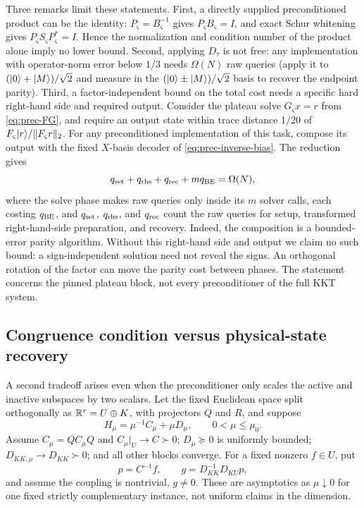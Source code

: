 Three remarks limit these statements.  First, a directly supplied
preconditioned product can be the identity: $P_\varsigma=B_\varsigma^{-1}$
gives $P_\varsigma B_\varsigma=I$, and exact Schur whitening gives
$P_\varsigma S_\varsigma P_\varsigma^*=I$.  Hence the normalization and
condition number of the product alone imply no lower bound.  Second,
applying $D_\tau$ is not free: any implementation with operator-norm error
below $1/3$ needs $\Omega(N)$ raw queries (apply it to $(\lvert 0\rangle+\lvert M\rangle)/\sqrt2$
and measure in the $(\lvert 0\rangle\pm\lvert M\rangle)/\sqrt2$ basis to recover the endpoint
parity).  Third, a factor-independent bound on the total cost needs a specific hard
right-hand side and required output.
Consider the plateau solve
$G_\varsigma x=r$ from \eqref{eq:prec-FG}, and require an output state within
trace distance $1/20$ of
$F_\varsigma\lvert r\rangle/\lVert F_\varsigma r\rVert_2$.  For any preconditioned
implementation of this task, compose its output with the fixed
$X$-basis decoder of \eqref{eq:prec-inverse-bias}.  The reduction gives
\begin{equation}
 q_{\rm set}+q_{\rm rhs}+q_{\rm rec}+m q_{\rm BE}=\Omega(N),
 \label{eq:prec-end-to-end-conservation}
\end{equation}
where the solve phase makes raw queries only inside its $m$ solver calls,
each costing $q_{\rm BE}$, and $q_{\rm set}$, $q_{\rm rhs}$, and
$q_{\rm rec}$ count the raw queries for setup, transformed right-hand-side
preparation, and recovery.  Indeed, the composition is a bounded-error parity
algorithm.  Without this right-hand side and output we claim no
such bound: a sign-independent solution need not reveal the signs.  An orthogonal rotation of the factor can move the parity cost
between phases.  The statement concerns the pinned plateau block, not every
preconditioner of the full KKT system.

\subsection{Congruence condition versus physical-state recovery}
\label{sec:preconditioning-congruence}

A second tradeoff arises even when the preconditioner only scales the active
and inactive subspaces by two scalars.  Let the fixed Euclidean space split orthogonally as
$\mathbb{R}^r=U\oplus K$, with projectors $Q$ and $R$, and suppose
\begin{equation}
 H_\mu=\mu^{-1}C_\mu+\mu D_\mu,\qquad 0<\mu\leq\mu_0.       \label{eq:prec-congruence-H}
\end{equation}
Assume $C_\mu=QC_\mu Q$ and $C_\mu|_U\to C\succ0$;
$D_\mu\succeq0$ is uniformly bounded;
$D_{KK,\mu}\to D_{KK}\succ0$; and all other blocks converge.  For a fixed
nonzero $f\in U$, put
\begin{equation}
 p=C^{-1}f,\qquad g=D_{KK}^{-1}D_{KU}p,                    \label{eq:prec-pg}
\end{equation}
and assume the coupling is nontrivial, $g\ne0$.  These are asymptotics as
$\mu\downarrow0$ for one fixed strictly complementary instance, not uniform
claims in the dimension.

